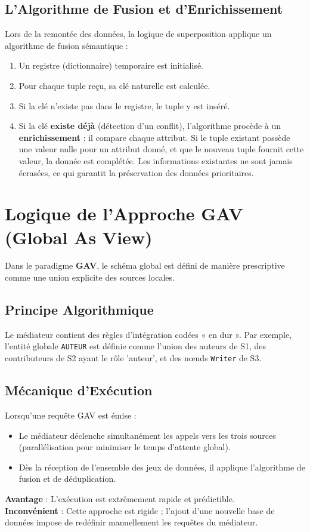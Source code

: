 \documentclass[12pt,a4paper]{article}
\begin{document}
\subsection{L'Algorithme de Fusion et d'Enrichissement}
Lors de la remontée des données, la logique de superposition applique un algorithme de fusion sémantique :
\begin{enumerate}
    \item Un registre (dictionnaire) temporaire est initialisé.
    \item Pour chaque tuple reçu, sa clé naturelle est calculée.
    \item Si la clé n'existe pas dans le registre, le tuple y est inséré.
    \item Si la clé \textbf{existe déjà} (détection d'un conflit), l'algorithme procède à un \textbf{enrichissement} : il compare chaque attribut. Si le tuple existant possède une valeur nulle pour un attribut donné, et que le nouveau tuple fournit cette valeur, la donnée est complétée. Les informations existantes ne sont jamais écrasées, ce qui garantit la préservation des données prioritaires.
\end{enumerate}

\section{Logique de l'Approche GAV (Global As View)}

Dans le paradigme \textbf{GAV}, le schéma global est défini de manière prescriptive comme une union explicite des sources locales.

\subsection{Principe Algorithmique}
Le médiateur contient des règles d'intégration codées « en dur ». Par exemple, l'entité globale \texttt{AUTEUR} est définie comme l'union des auteurs de S1, des contributeurs de S2 ayant le rôle 'auteur', et des nœuds \texttt{Writer} de S3.

\subsection{Mécanique d'Exécution}
Lorsqu'une requête GAV est émise :
\begin{itemize}
    \item Le médiateur déclenche simultanément les appels vers les trois sources (parallélisation pour minimiser le temps d'attente global).
    \item Dès la réception de l'ensemble des jeux de données, il applique l'algorithme de fusion et de déduplication.
\end{itemize}
\textbf{Avantage} : L'exécution est extrêmement rapide et prédictible.\\
\textbf{Inconvénient} : Cette approche est rigide ; l'ajout d'une nouvelle base de données impose de redéfinir manuellement les requêtes du médiateur.
\end{document}
